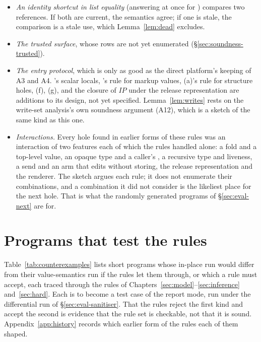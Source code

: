 \begin{itemize}
escaped holders. A9 covers what a crash screen may print.
\item \emph{An identity shortcut in list equality} (answering  at once for
) compares two references. If both are current, the semantics agree; if one is stale,
the comparison is a stale use, which Lemma~\ref{lem:dead} excludes.
\item \emph{The trusted surface}, whose rows are not yet enumerated (\S\ref{sec:soundness-trusted}).
\item \emph{The entry protocol}, which is only as good as the direct platform's keeping of A3 and A4.
's scalar locals, 's rule for markup values, (a)'s rule for structure holes, (f),
(g), and the closure of $\mathit{IP}$ under the release representation are additions to its design, not
yet specified. Lemma~\ref{lem:writes} rests on the write-set analysis's own soundness argument (A12), which
is a sketch of the same kind as this one.
\item \emph{Interactions.} Every hole found in earlier forms of these rules was an interaction of two
features each of which the rules handled alone: a fold and a top-level value, an opaque type and a
caller's \Disjoint, a recursive type and liveness, a send and an arm that edits without storing, the
release representation and the renderer. The sketch argues each rule; it does not enumerate their
combinations, and a combination it did not consider is the likeliest place for the next hole. That is
what the randomly generated programs of \S\ref{sec:eval-next} are for.
\end{itemize}

\section{Programs that test the rules}
\label{sec:soundness-counterexamples}

Table~\ref{tab:counterexamples} lists short programs whose in-place run would differ from their
value-semantics run if the rules let them through, or which a rule must accept, each traced through the
rules of Chapters~\ref{sec:model}--\ref{sec:inference} and~\ref{sec:hard}. Each is to become a test case
of the report mode, run under the differential run of \S\ref{sec:eval-sanitiser}. That the rules reject
the first kind and accept the second is evidence that the rule set is checkable, not that it is sound.
Appendix~\ref{app:history} records which earlier form of the rules each of them shaped.

